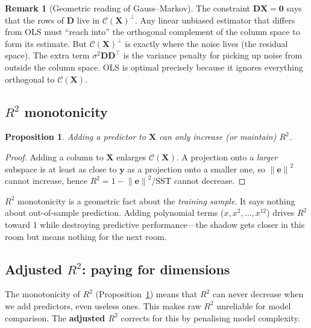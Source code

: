 \documentclass[11pt,a4paper]{article}
\theoremstyle{plain}
\newtheorem{proposition}[theorem]{Proposition}
\theoremstyle{definition}
\newtheorem{remark}[theorem]{Remark}
\newcommand{\bX}{\bm{X}}
\newcommand{\by}{\bm{y}}
\newcommand{\be}{\bm{e}}
\newcommand{\bD}{\bm{D}}
\newcommand{\Col}{\mathcal{C}}
\newcommand{\norm}[1]{\left\lVert #1 \right\rVert}
\begin{document}
\begin{remark}[Geometric reading of Gauss--Markov]
The constraint $\bD\bX = \bm{0}$ says that the rows of $\bD$ live in
$\Col(\bX)^\perp$.  Any linear unbiased estimator that differs from OLS
must ``reach into'' the orthogonal complement of the column space to
form its estimate.  But $\Col(\bX)^\perp$ is exactly where the noise lives
(the residual space).  The extra term $\sigma^2\bD\bD^\top$ is the
variance penalty for picking up noise from outside the column space.
OLS is optimal precisely because it ignores everything orthogonal to
$\Col(\bX)$.
\end{remark}

\subsection{$R^2$ monotonicity}

\begin{proposition}\label{prop:r2mono}
Adding a predictor to $\bX$ can only increase (or maintain) $R^2$.
\end{proposition}

\begin{proof}
Adding a column to $\bX$ enlarges $\Col(\bX)$.
A projection onto a \emph{larger} subspace is at least as close to
$\by$ as a projection onto a smaller one, so $\norm{\be}^2$ cannot
increase, hence $R^2 = 1 - \norm{\be}^2/\text{SST}$ cannot decrease.
\end{proof}

\begin{warning}
$R^2$ monotonicity is a geometric fact about the \emph{training sample}.
It says nothing about out-of-sample prediction.
Adding polynomial terms ($x, x^2,\dots,x^{12}$) drives $R^2$ toward 1
while destroying predictive performance---the shadow gets closer in this
room but means nothing for the next room.
\end{warning}

\subsection{Adjusted $R^2$: paying for dimensions}\label{sec:adj-r2}

The monotonicity of $R^2$ (Proposition~\ref{prop:r2mono}) means that
$R^2$ can never decrease when we add predictors, even useless ones.
This makes raw $R^2$ unreliable for model comparison.
The \textbf{adjusted $R^2$} corrects for this by penalising model complexity.
\end{document}
